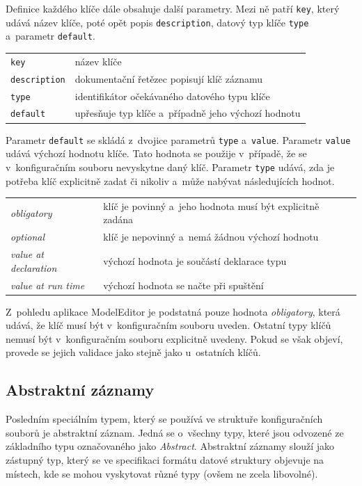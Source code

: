 \documentclass[FM,bw,DP]{tulthesis}
\begin{document}
Definice každého klíče dále obsahuje další parametry. Mezi ně patří \texttt{key}, který udává název klíče, poté opět popis \texttt{description}, datový typ klíče \texttt{type} a~parametr \texttt{default}.

\vspace{0.5cm}
\begin{tabular}{m{4cm}@{}l}
\texttt{key}\dotfill & název klíče \\
\texttt{description}\dotfill & dokumentační řetězec popisují klíč záznamu \\
\texttt{type}\dotfill & identifikátor očekávaného datového typu klíče \\
\texttt{default}\dotfill & upřesňuje typ klíče a~případně jeho výchozí hodnotu \\
\end{tabular}
\vspace{0.5cm}

Parametr \texttt{default} se skládá z~dvojice parametrů \texttt{type} a~\texttt{value}. Parametr \texttt{value} udává výchozí hodnotu klíče. Tato hodnota se použije v~případě, že se v~konfiguračním souboru nevyskytne daný klíč. Parametr \texttt{type} udává, zda je potřeba klíč explicitně zadat či nikoliv a~může nabývat následujících hodnot.

\begin{longtable}{m{4cm}@{}l}
\textit{obligatory}\dotfill & klíč je povinný a~jeho hodnota musí být explicitně zadána \\
\textit{optional}\dotfill & klíč je nepovinný a~nemá žádnou výchozí hodnotu \\
\textit{value at declaration}\dotfill & výchozí hodnota je součástí deklarace typu \\
\textit{value at run time}\dotfill & výchozí hodnota se načte při spuštění \\
\end{longtable}

Z~pohledu aplikace ModelEditor je podstatná pouze hodnota \textit{obligatory}, která udává, že klíč musí být v~konfiguračním souboru uveden. Ostatní typy klíčů nemusí být v~konfiguračním souboru explicitně uvedeny. Pokud se však objeví, provede se jejich validace jako stejně jako u~ostatních klíčů.

\subsection{Abstraktní záznamy}

Posledním speciálním typem, který se používá ve struktuře konfiguračních souborů je abstraktní záznam. Jedná se o~všechny typy, které jsou odvozené ze základního typu označovaného jako \textit{Abstract}. Abstraktní záznamy slouží jako zástupný typ, který se ve specifikaci formátu datové struktury objevuje na místech, kde se mohou vyskytovat různé typy (ovšem ne zcela libovolné).
\end{document}
